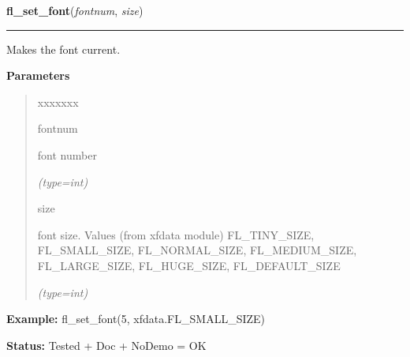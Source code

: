     \label{xformslib:flbasic:fl_set_font}

    \vspace{0.5ex}

\hspace{.8\funcindent}\begin{boxedminipage}{\funcwidth}

    \raggedright \textbf{fl\_set\_font}(\textit{fontnum}, \textit{size})

    \vspace{-1.5ex}

    \rule{\textwidth}{0.5\fboxrule}
\setlength{\parskip}{2ex}
    Makes the font current.

\setlength{\parskip}{1ex}
      \textbf{Parameters}
      \vspace{-1ex}

      \begin{quote}
        \begin{Ventry}{xxxxxxx}

          \item[fontnum]

          font number

            {\it (type=int)}

          \item[size]

          font size. Values (from xfdata module) FL\_TINY\_SIZE, 
          FL\_SMALL\_SIZE, FL\_NORMAL\_SIZE, FL\_MEDIUM\_SIZE, 
          FL\_LARGE\_SIZE, FL\_HUGE\_SIZE, FL\_DEFAULT\_SIZE

            {\it (type=int)}

        \end{Ventry}

      \end{quote}

\textbf{Example:} fl\_set\_font(5, xfdata.FL\_SMALL\_SIZE)



\textbf{Status:} Tested + Doc + NoDemo = OK



    \end{boxedminipage}

    \label{xformslib:flbasic:fl_get_char_height}

